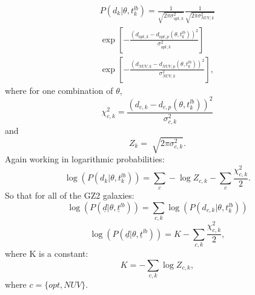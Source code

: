 \documentclass{mn2e}
\begin{document}

\begin{multline*}
P(d_{k}|\theta, t^{lb}_{k}) = \frac{1}{\sqrt{2\pi\sigma_{opt, k}^2}}\frac{1}{\sqrt{2\pi\sigma_{NUV, k}^2}} \\ \exp{\left[ - \frac{(d_{opt, k} - d_{opt, p}(\theta, t_{k}^{lb}))^2}{\sigma_{opt, k}^2} \right]} \\ \exp{\left[ - \frac{(d_{NUV, k} - d_{NUV, p}(\theta, t_{k}^{lb}))^2}{\sigma_{NUV, k}^2} \right]},
\end{multline*}
where for one combination of $\theta$,
\begin{equation*}
\chi_{c, k}^2 = \frac{(d_{c, k} - d_{c, p}(\theta, t_{k}^{lb}))^2}{\sigma_{c, k}^2}
\end{equation*}
and
\begin{equation*}
Z_{k} = \sqrt[]{2\pi\sigma_{c, k}^2}.
\end{equation*}
Again working in logarithmic probabilities:
\begin{equation*}
\log{(P(d_{k}|\theta, t^{lb}_{k}))} = \sum_{c} - \log{Z_{c,k}} - \sum_{c} \frac{\chi_{c, k}^2}{2}.
\end{equation*}
So that for all of the GZ2 galaxies:
\begin{equation*}
\log{(P(\underline{d}|\theta, \underline{t}^{lb}))} = \sum_{c, k} \log{(P(d_{c, k}|\theta, t_{k}^{lb}))}
\end{equation*}
\begin{equation*}
\log{(P(\underline{d}|\theta,  \underline{t}^{lb}))}  = K - \sum_{c, k} \frac{\chi_{c, k}^2}{2},
\end{equation*}
where K is a constant:
\begin{equation*}
K = - \sum_{c, k} \log{Z_{c, k}},
\end{equation*}
where $c=\{opt, NUV\}$. 
\end{document}
